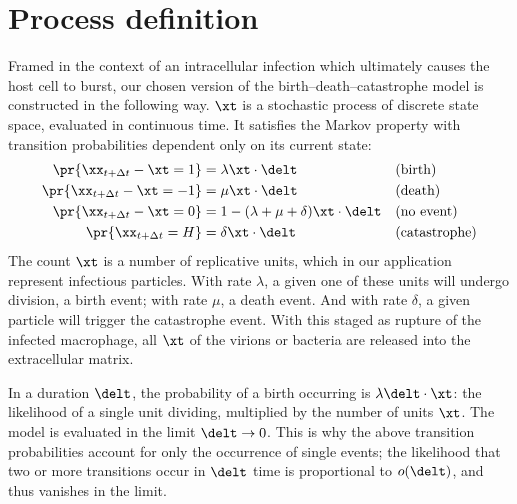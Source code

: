 \section{Process definition}
\label{sec:process_definition}

Framed in the context of an intracellular infection which ultimately causes the
host cell to burst, our chosen version of the birth--death--catastrophe model
is constructed in the following way. $\xt$ is a stochastic process of discrete
state space, evaluated in continuous time. It satisfies the Markov property
with transition probabilities dependent only on its current state:
\begin{align*}
\pr{\xx_{t+\Delta t} - \xt = 1} &= \lambda \xt \cdot \delt&&\text{(birth)}\\
\pr{\xx_{t+\Delta t} - \xt = -1} &= \mu \xt  \cdot \delt&&\text{(death)}\\
\pr{\xx_{t+\Delta t} - \xt = 0} &=1 -  (\lambda+\mu+\delta) \xt  \cdot \delt&&\text{(no event)}\\
\pr{\xx_{t+\Delta t} = H} &=\delta \xt  \cdot \delt&&\text{(catastrophe)}
\end{align*}
The count $\xt$ is a number of replicative units, which in our application
represent infectious particles. With rate $\lambda$, a given one of these units
will undergo division, a birth event; with rate $\mu$, a death event. And with
rate $\delta$, a given particle will trigger the catastrophe event. With this
staged as rupture of the infected macrophage, all $\xt$ of the virions or
bacteria are released into the extracellular matrix.

In a duration $\delt$, the probability of a birth occurring is
$\lambda \delt \cdot \xt$: the likelihood of a single unit dividing, multiplied
by the number of units $\xt$. The model is evaluated in the limit
$\delt \to 0$. This is why the above transition probabilities account for only
the occurrence of single events; the likelihood that two or more transitions
occur in $\delt$ time is proportional to $o(\delt)$, and thus vanishes in the
limit.


